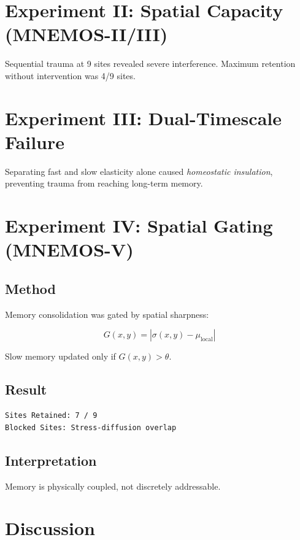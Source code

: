 \documentclass[11pt, a4paper]{article}
\begin{document}
\section{Experiment II: Spatial Capacity (MNEMOS-II/III)}

Sequential trauma at 9 sites revealed severe interference.
Maximum retention without intervention was 4/9 sites.

\section{Experiment III: Dual-Timescale Failure}

Separating fast and slow elasticity alone caused \textit{homeostatic insulation}, preventing trauma from reaching long-term memory.

\section{Experiment IV: Spatial Gating (MNEMOS-V)}

\subsection{Method}
Memory consolidation was gated by spatial sharpness:

\[
G(x,y) = |\sigma(x,y) - \mu_{\text{local}}|
\]

Slow memory updated only if $G(x,y) > \theta$.

\subsection{Result}

\begin{lstlisting}
Sites Retained: 7 / 9
Blocked Sites: Stress-diffusion overlap
\end{lstlisting}

\subsection{Interpretation}
Memory is physically coupled, not discretely addressable.

\section{Discussion}
\end{document}
